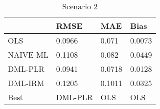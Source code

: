 \begin{table}[H]
\centering
\caption{Scenario 2}
\label{Scenario2}
\begin{tabular}{L{3.3333333333333335cm}L{2.6666666666666665cm}R{2.0cm}R{2.6666666666666665cm}}
\toprule
{} &     RMSE &     MAE &    Bias \\
\midrule
OLS      &   0.0966 &   0.071 &  0.0073 \\
NAIVE-ML &   0.1108 &   0.082 &  0.0449 \\
DML-PLR  &   0.0941 &  0.0718 &  0.0128 \\
DML-IRM  &   0.1205 &  0.1011 &  0.0325 \\
Best     &  DML-PLR &     OLS &     OLS \\
\bottomrule
\end{tabular}
\end{table}
